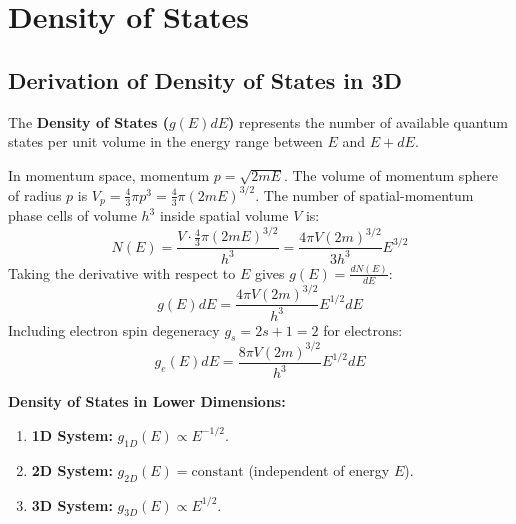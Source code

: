\documentclass[12pt,a4paper]{article}
\begin{document}
\section{Density of States}

\subsection{Derivation of Density of States in 3D}

The \textbf{Density of States ($g(E)dE$)} represents the number of available quantum states per unit volume in the energy range between $E$ and $E + dE$.

\begin{tcolorbox}[formulabox, title={\textbf{3D Free Particle Density of States Derivation}}]
In momentum space, momentum $p = \sqrt{2mE}$. The volume of momentum sphere of radius $p$ is $V_p = \frac{4}{3}\pi p^3 = \frac{4}{3}\pi (2mE)^{3/2}$.
The number of spatial-momentum phase cells of volume $h^3$ inside spatial volume $V$ is:
\begin{equation}
N(E) = \frac{V \cdot \frac{4}{3}\pi (2mE)^{3/2}}{h^3} = \frac{4\pi V (2m)^{3/2}}{3 h^3} E^{3/2}
\end{equation}
Taking the derivative with respect to $E$ gives $g(E) = \frac{dN(E)}{dE}$:
\begin{equation}
g(E) dE = \frac{4\pi V (2m)^{3/2}}{h^3} E^{1/2} dE
\end{equation}
Including electron spin degeneracy $g_s = 2s+1 = 2$ for electrons:
\begin{equation}
g_e(E) dE = \frac{8\pi V (2m)^{3/2}}{h^3} E^{1/2} dE
\end{equation}
\end{tcolorbox}

\textbf{Density of States in Lower Dimensions:}\par\noindent
\begin{enumerate}[leftmargin=*, itemsep=2pt]
  \item \textbf{1D System:} $g_{1D}(E) \propto E^{-1/2}$.
  \item \textbf{2D System:} $g_{2D}(E) = \text{constant}$ (independent of energy $E$).
  \item \textbf{3D System:} $g_{3D}(E) \propto E^{1/2}$.
\end{enumerate}
\end{document}
